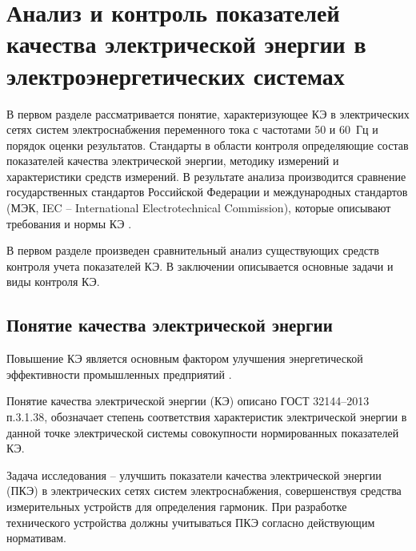 \chapter{Анализ и контроль показателей качества электрической энергии в электроэнергетических системах}\label{ch:ch1}

В первом разделе рассматривается понятие, характеризующее КЭ в электрических сетях систем электроснабжения переменного тока с частотами 50 и 60~Гц и порядок оценки результатов. Стандарты в области контроля определяющие состав показателей качества электрической энергии, методику измерений и характеристики средств измерений. В результате анализа производится сравнение государственных стандартов Российской Федерации и международных стандартов (МЭК, IEC – International Electrotechnical Commission), которые описывают требования и нормы КЭ \cite{IEC}.

В первом разделе произведен сравнительный анализ существующих средств контроля учета показателей КЭ. В заключении описывается основные задачи и виды контроля КЭ.

\section{Понятие качества электрической энергии}\label{sec:ch1/sec1_1}
Повышение КЭ является основным фактором улучшения энергетической эффективности промышленных предприятий \cite{закон2009энергосбережении}. 

Понятие качества электрической энергии (КЭ) описано ГОСТ 32144–2013~\cite{ГОСТ32144-2013} п.3.1.38, обозначает степень соответствия характеристик электрической энергии в данной точке электрической системы совокупности нормированных показателей КЭ.

Задача исследования – улучшить показатели качества электрической энергии (ПКЭ) в электрических сетях систем электроснабжения, совершенствуя средства измерительных устройств для определения гармоник. При разработке технического устройства должны учитываться ПКЭ  согласно действующим нормативам. 


